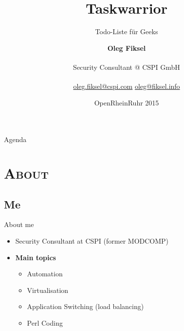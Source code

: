 \documentclass[xcolor=x11names,compress]{beamer}
\makeatletter
\renewcommand{\(}{\begin{columns}}
\renewcommand{\)}{\end{columns}}
\newcommand{\<}[1]{\begin{column}{#1}}
\renewcommand{\>}{\end{column}}
\def \Author {Oleg Fiksel}
\def \AuthorEmail {\href{mailto:oleg.fiksel@cspi.com}{oleg.fiksel@cspi.com}}
\makeatother
\begin{document}

\begin{frame}
\title{Taskwarrior}
\subtitle{Todo-Liste für Geeks}
\author{
	\textbf{\Author}\\[1em]
	\begin{it}
	 Security Consultant @ CSPI GmbH\\[1em]
	 \begin{footnotesize}
		\AuthorEmail \hspace{0.5pt} \textbar \hspace{0.5pt} \href{mailto:oleg@fiksel.info}{oleg@fiksel.info}
	 \end{footnotesize}
	 \end{it}
}
\date{OpenRheinRuhr 2015}
\titlepage
\end{frame}

\begin{frame}{Agenda}
\tableofcontents
\end{frame}


\section{\scshape{About}}

\subsection*{Me}
\begin{frame}{About me}
	\begin{itemize}
		\item Security Consultant at CSPI (former MODCOMP)
		\item \textbf{Main topics}
			\begin{itemize}
				\item Automation
				\item Virtualisation
				\item Application Switching (load balancing)
				\item Perl Coding
			\end{itemize}
	\end{itemize}
\end{frame}
\end{document}
